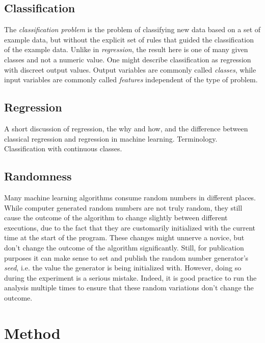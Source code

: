 \documentclass[a4paper,man,12pt,apacite]{apa6} %
\begin{document}
\subsection{Classification}
The \emph{classification problem} is the problem of classifying new data based
on a set of example data, but without the explicit set of rules that guided the
classification of the example data.
Unlike in \emph{regression}, the result here is one of many given classes
and not a numeric value.
One might describe classification as regression with discreet output values.
Output variables are commonly called \emph{classes}, while input variables
are commonly called \emph{features} independent of the type of problem.

\subsection{Regression}
A short discussion of regression, the why and how, and the difference
between classical regression and regression in machine learning.
Terminology. Classification with continuous classes.

\subsection{Randomness}
Many machine learning algorithms consume random numbers in different places.
While computer generated random numbers are not truly random, they still
cause the outcome of the algorithm to change slightly between different
executions, due to the fact that they are customarily initialized with
the current time at the start of the program.
These changes might unnerve a novice, but don't change the outcome of the
algorithm significantly.
Still, for publication purposes it can make sense to set and publish the
random number generator's \emph{seed}, i.e. the value the generator is being
initialized with.
However, doing so during the experiment
is a serious mistake.
Indeed, it is good practice to run the analysis multiple times to ensure
that these random variations don't change the outcome.



\section{Method}
\end{document}
